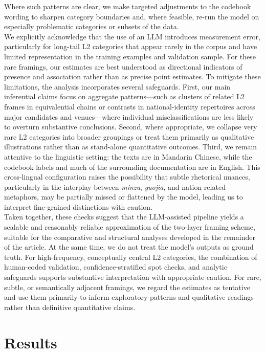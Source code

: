 \documentclass[man,12pt]{apa7}
\begin{document}
Where such patterns are clear, we make targeted adjustments to the codebook wording to sharpen category boundaries and, where feasible, re-run the model on especially problematic categories or subsets of the data.\\%
We explicitly acknowledge that the use of an LLM introduces measurement error, particularly for long-tail L2 categories that appear rarely in the corpus and have limited representation in the training examples and validation sample. 
For these rare framings, our estimates are best understood as directional indicators of presence and association rather than as precise point estimates. 
To mitigate these limitations, the analysis incorporates several safeguards. 
First, our main inferential claims focus on aggregate patterns---such as clusters of related L2 frames in equivalential chains or contrasts in national-identity repertoires across major candidates and venues---where individual misclassifications are less likely to overturn substantive conclusions. 
Second, where appropriate, we collapse very rare L2 categories into broader groupings or treat them primarily as qualitative illustrations rather than as stand-alone quantitative outcomes. 
Third, we remain attentive to the linguistic setting: the texts are in Mandarin Chinese, while the codebook labels and much of the surrounding documentation are in English. 
This cross-lingual configuration raises the possibility that subtle rhetorical nuances, particularly in the interplay between \emph{minzu}, \emph{guojia}, and nation-related metaphors, may be partially missed or flattened by the model, leading us to interpret fine-grained distinctions with caution.\\%
Taken together, these checks suggest that the LLM-assisted pipeline yields a scalable and reasonably reliable approximation of the two-layer framing scheme, suitable for the comparative and structural analyses developed in the remainder of the article. 
At the same time, we do not treat the model's outputs as ground truth. 
For high-frequency, conceptually central L2 categories, the combination of human-coded validation, confidence-stratified spot checks, and analytic safeguards supports substantive interpretation with appropriate caution. 
For rare, subtle, or semantically adjacent framings, we regard the estimates as tentative and use them primarily to inform exploratory patterns and qualitative readings rather than definitive quantitative claims.\\%

\iffalse
\section{Results}
\end{document}
